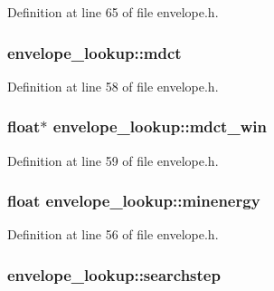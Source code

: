 Definition at line 65 of file envelope.\+h.

\subsubsection[{\texorpdfstring{mdct}{mdct}}]{ envelope\+\_\+lookup\+::mdct}\hypertarget{structenvelope__lookup_a76d53a8e25d46b90080f89a14f798f59}{}\label{structenvelope__lookup_a76d53a8e25d46b90080f89a14f798f59}


Definition at line 58 of file envelope.\+h.

\subsubsection[{\texorpdfstring{mdct\+\_\+win}{mdct_win}}]{\setlength{\rightskip}{0pt plus 5cm}float$\ast$ envelope\+\_\+lookup\+::mdct\+\_\+win}\hypertarget{structenvelope__lookup_afdef34e306699f8959e2cd930b0a2f9d}{}\label{structenvelope__lookup_afdef34e306699f8959e2cd930b0a2f9d}


Definition at line 59 of file envelope.\+h.

\subsubsection[{\texorpdfstring{minenergy}{minenergy}}]{\setlength{\rightskip}{0pt plus 5cm}float envelope\+\_\+lookup\+::minenergy}\hypertarget{structenvelope__lookup_ac6bb522bcac62b0c384101da560729ac}{}\label{structenvelope__lookup_ac6bb522bcac62b0c384101da560729ac}


Definition at line 56 of file envelope.\+h.

\subsubsection[{\texorpdfstring{searchstep}{searchstep}}]{ envelope\+\_\+lookup\+::searchstep}\hypertarget{structenvelope__lookup_aa06fe3f540bbf51b3046705730201dd2}{}\label{structenvelope__lookup_aa06fe3f540bbf51b3046705730201dd2}


